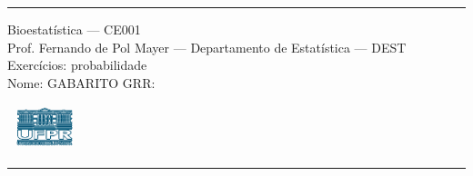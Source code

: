 \documentclass[a4paper,11pt,fleqn]{article}\usepackage[]{graphicx}\usepackage[]{color}
\theoremstyle{definition}
\begin{document}
\reversemarginpar %





\hrule
\vspace{0.3cm}

\begin{minipage}[c]{.85\textwidth}
  Bioestatística --- CE001 \\
  Prof. Fernando de Pol Mayer --- Departamento de Estatística --- DEST \\
  Exercícios: probabilidade \\
  Nome: GABARITO   \hfill GRR: \hspace{2cm}
\end{minipage}\hfill
\begin{minipage}[c]{.15\textwidth}
\flushright
\includegraphics[width=2.2cm]{../img/ufpr-logo.png}
\end{minipage}

\vspace{0.3cm}
\hrule
\vspace{0.3cm}
\end{document}
